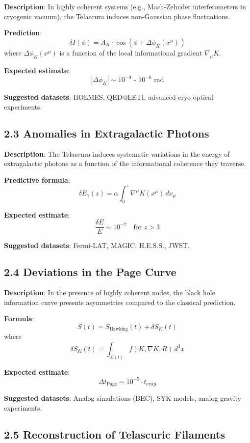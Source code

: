 \documentclass[12pt]{article}
\begin{document}
\textbf{Description}: In highly coherent systems (e.g., Mach-Zehnder interferometers in cryogenic vacuum), the Telascura induces non-Gaussian phase fluctuations.

\textbf{Prediction}:
\[
\delta I(\phi) = A_K \cdot \cos(\phi + \Delta\phi_K(x^\mu))
\]
where $\Delta\phi_K(x^\mu)$ is a function of the local informational gradient $\nabla_\mu K$.

\textbf{Expected estimate}:
\[
|\Delta\phi_K| \sim 10^{-9} \text{ - } 10^{-6} \text{ rad}
\]

\textbf{Suggested datasets}: HOLMES, QED@LETI, advanced cryo-optical experiments.

\subsection*{2.3 Anomalies in Extragalactic Photons}

\textbf{Description}: The Telascura induces systematic variations in the energy of extragalactic photons as a function of the informational coherence they traverse.

\textbf{Predictive formula}:
\[
\delta E_\gamma(z) = \alpha \int_0^z \nabla^\mu K(x^\mu) \, dx_\mu
\]

\textbf{Expected estimate}:
\[
\frac{\delta E}{E} \sim 10^{-7} \quad \text{for } z > 3
\]

\textbf{Suggested datasets}: Fermi-LAT, MAGIC, H.E.S.S., JWST.

\subsection*{2.4 Deviations in the Page Curve}

\textbf{Description}: In the presence of highly coherent nodes, the black hole information curve presents asymmetries compared to the classical prediction.

\textbf{Formula}:
\[
S(t) = S_{\text{Hawking}}(t) + \delta S_K(t)
\]
where
\[
\delta S_K(t) = \int_{\Sigma(t)} f(K, \nabla K, R) \, d^3x
\]

\textbf{Expected estimate}:
\[
\Delta t_{\text{Page}} \sim 10^{-5} \cdot t_{\text{evap}}
\]

\textbf{Suggested datasets}: Analog simulations (BEC), SYK models, analog gravity experiments.

\subsection*{2.5 Reconstruction of Telascuric Filaments}
\end{document}
